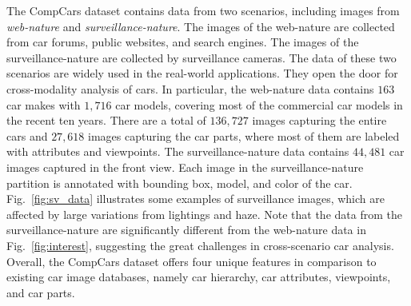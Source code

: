 \documentclass[10pt,twocolumn,letterpaper]{article}
\newcommand{\datasetName}{CompCars}
\begin{document}
The \datasetName{} dataset contains data from two scenarios, including images from \emph{web-nature} and \emph{surveillance-nature}.
%
The images of the web-nature are collected from car forums, public websites, and search engines.
%
The images of the surveillance-nature are collected by surveillance cameras. The data of these two scenarios are widely used in the real-world applications.
%
They open the door for cross-modality analysis of cars.
%
In particular, the web-nature data contains $163$ car makes with $1,716$ car models, covering most of the commercial car models in the recent ten years.
%
There are a total of $136,727$ images capturing the entire cars and $27,618$ images capturing the car parts, where most of them are labeled with attributes and viewpoints.
%
The surveillance-nature data contains $44,481$ car images captured in the front view.
%
Each image in the surveillance-nature partition is annotated with bounding box, model, and color of the car.
Fig.~\ref{fig:sv_data} illustrates some examples of surveillance images, which are affected by large variations from lightings and haze.
%
Note that the data from the surveillance-nature are significantly different from the web-nature data in Fig.~\ref{fig:interest}, suggesting the great challenges in cross-scenario car analysis.
%
Overall, the \datasetName{} dataset offers four unique features in comparison to existing car image databases, namely car hierarchy, car attributes, viewpoints, and car parts.
%

\end{document}

